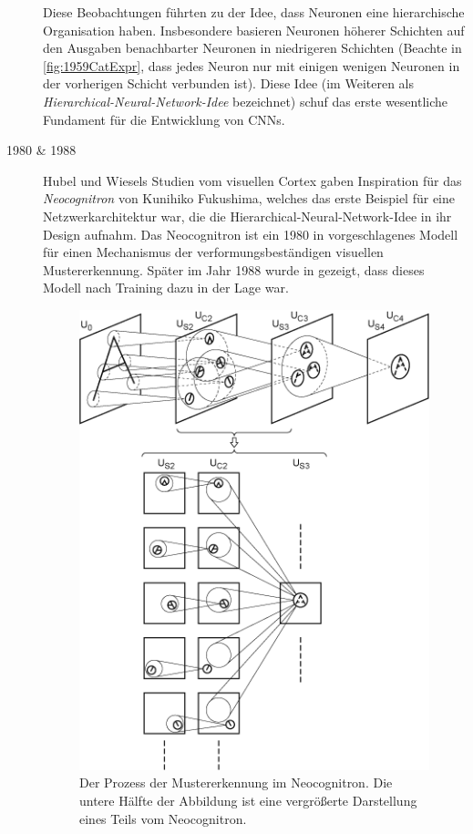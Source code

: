 \begin{description}
	Diese Beobachtungen führten zu der Idee, dass Neuronen eine hierarchische Organisation haben. Insbesondere basieren Neuronen höherer Schichten auf den Ausgaben benachbarter Neuronen in niedrigeren Schichten (Beachte in \autoref{fig:1959CatExpr}, dass jedes Neuron nur mit einigen wenigen Neuronen in der vorherigen Schicht verbunden ist). Diese Idee (im Weiteren als \emph{Hierarchical-Neural-Network-Idee} bezeichnet) schuf das erste wesentliche Fundament für die Entwicklung von CNNs.
		
	\item[1980 \& 1988] 
	
	Hubel und Wiesels Studien vom visuellen Cortex gaben Inspiration für das \emph{Neocognitron} von Kunihiko Fukushima, welches das erste Beispiel für eine Netzwerkarchitektur war, die die Hierarchical-Neural-Network-Idee in ihr Design aufnahm. Das Neocognitron ist ein 1980 in \cite{Neocognitron1980} vorgeschlagenes Modell für einen Mechanismus der verformungsbeständigen visuellen Mustererkennung. Später im Jahr 1988 wurde in \cite{Neocognitron1988} gezeigt, dass dieses Modell nach Training dazu in der Lage war.
	
	\begin{figure}[!ht]
		\centering
		\includegraphics[width=0.72\linewidth]{images/Neocognitron}
		\caption{Der Prozess der Mustererkennung im Neocognitron. Die untere Hälfte der Abbildung ist eine vergrößerte Darstellung eines Teils vom Neocognitron. \protect\cite{neocognitron:scholarpediafig2}}
		\label{fig:neocognitron}
	\end{figure}


\end{description}
